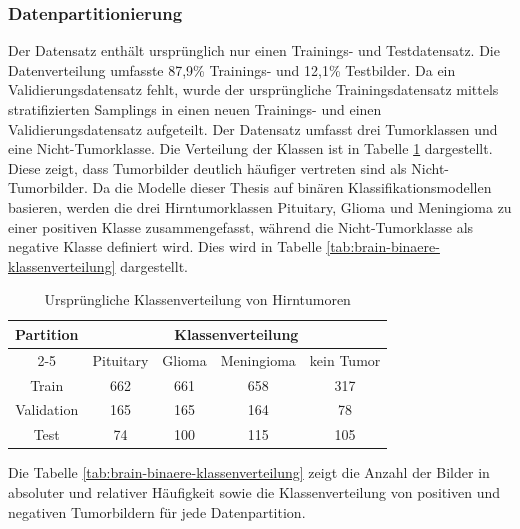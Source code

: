 \subsubsection{Datenpartitionierung} \label{chap:brain-datapartition}
Der Datensatz enthält ursprünglich nur einen Trainings- und Testdatensatz. Die Datenverteilung umfasste 87,9\% Trainings- und 12,1\% Testbilder. Da ein Validierungsdatensatz fehlt, wurde der ursprüngliche Trainingsdatensatz mittels stratifizierten Samplings in einen neuen Trainings- und einen Validierungsdatensatz aufgeteilt.  Der Datensatz umfasst drei Tumorklassen und eine Nicht-Tumorklasse. Die Verteilung der Klassen ist in Tabelle \ref{tab:brain-orginale-klassenverteilung} dargestellt. Diese zeigt, dass Tumorbilder deutlich häufiger vertreten sind als Nicht-Tumorbilder. Da die Modelle dieser Thesis auf binären Klassifikationsmodellen basieren, werden die drei Hirntumorklassen Pituitary, Glioma und Meningioma zu einer positiven Klasse zusammengefasst, während die Nicht-Tumorklasse als negative Klasse definiert wird. Dies wird in Tabelle \ref{tab:brain-binaere-klassenverteilung} dargestellt.

\begin{table}[H]
    \centering
    \begin{tabular}{@{}ccccc@{}}
        \toprule
         Partition & \multicolumn{4}{c}{Klassenverteilung}              \\ 
        \cmidrule(l){2-5}
                    & Pituitary & Glioma & Meningioma & kein Tumor      \\ 
        \midrule 
        Train      & 662 & 661 & 658 & 317                              \\
        Validation & 165 & 165 & 164 & 78                               \\
        Test       & 74  & 100 & 115 & 105                              \\ 
        \bottomrule
    \end{tabular}
    \caption{Ursprüngliche Klassenverteilung von Hirntumoren}
    \label{tab:brain-orginale-klassenverteilung}
\end{table}

Die Tabelle \ref{tab:brain-binaere-klassenverteilung} zeigt die Anzahl der Bilder in absoluter und relativer Häufigkeit sowie die Klassenverteilung von positiven und negativen Tumorbildern für jede Datenpartition.

